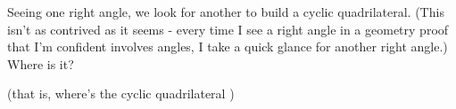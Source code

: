 










Seeing one right angle, we look for another to build a cyclic quadrilateral. (This isn't as contrived as it seems - every time I see a right angle in a geometry proof that I'm confident involves angles, I take a quick glance for another right angle.) Where is it?

(that is, where's the cyclic quadrilateral  )








